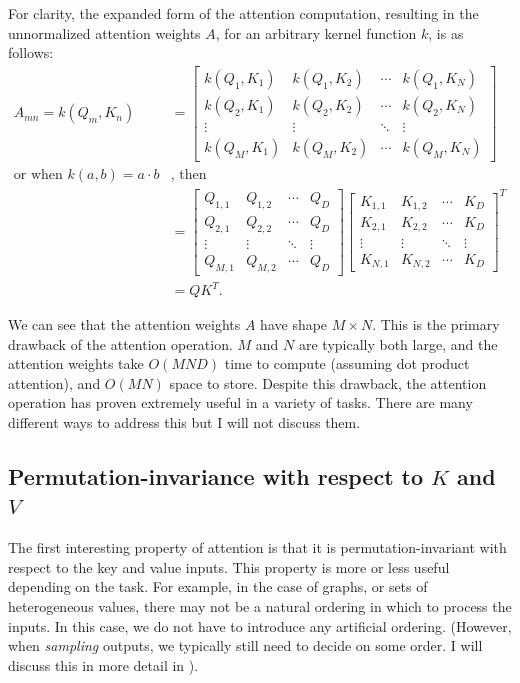 For clarity, the expanded form of the attention computation, resulting in the unnormalized attention weights $A$, for an arbitrary kernel function $k$, is as follows:
\begin{align*}
A_{mn} = k(Q_m, K_n)
&= \begin{bmatrix}
    k(Q_{1}, K_{1}) & k(Q_{1}, K_{2}) & \cdots & k(Q_{1}, K_{N}) \\
    k(Q_{2}, K_{1}) & k(Q_{2}, K_{2}) & \cdots & k(Q_{2}, K_{N}) \\
    \vdots & \vdots & \ddots & \vdots \\
    k(Q_{M}, K_{1}) & k(Q_{M}, K_{2}) & \cdots & k(Q_{M}, K_{N})
\end{bmatrix} \\
\text{or when\ } k(a, b) = a \cdot b &\text{, then} \\
&= \begin{bmatrix}
    Q_{1,1} & Q_{1,2} & \cdots & Q_D \\
    Q_{2,1} & Q_{2,2} & \cdots & Q_D \\
    \vdots & \vdots & \ddots & \vdots \\
    Q_{M,1} & Q_{M,2} & \cdots & Q_D
\end{bmatrix} \begin{bmatrix}
    K_{1,1} & K_{1,2} & \cdots & K_D \\
    K_{2,1} & K_{2,2} & \cdots & K_D \\
    \vdots & \vdots & \ddots & \vdots \\
    K_{N,1} & K_{N,2} & \cdots & K_D
\end{bmatrix}^T \\
&= Q K^T .
\end{align*}

We can see that the attention weights $A$ have shape $M×N$. This is the primary drawback of the attention operation. $M$ and $N$ are typically both large, and the attention weights take $O(MND)$ time to compute (assuming dot product attention), and $O(MN)$ space to store. Despite this drawback, the attention operation has proven extremely useful in a variety of tasks. There are many different ways to address this but I will not discuss them.

\subsection{Permutation-invariance with respect to $K$ and $V$}

The first interesting property of attention is that it is permutation-invariant with respect to the key and value inputs. This property is more or less useful depending on the task. For example, in the case of graphs, or sets of heterogeneous values, there may not be a natural ordering in which to process the inputs. In this case, we do not have to introduce any artificial ordering. (However, when \textit{sampling} outputs, we typically still need to decide on some order. I will discuss this in more detail in ).

